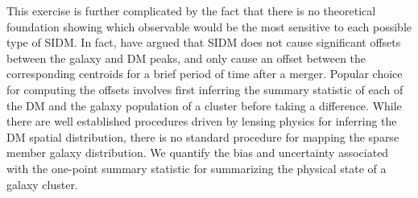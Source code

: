 This exercise is further complicated by the fact that there is no theoretical
foundation showing which observable would be the most sensitive to each
possible type of SIDM. In fact, \cite{Kahlhoefer14} have argued that SIDM 
does not cause
significant offsets between the galaxy and DM peaks, and only cause an offset
between the corresponding centroids for a brief period of time after a merger. 
Popular choice for computing the offsets involves first inferring the summary
statistic of each of the DM and the galaxy population of a cluster before
taking a difference.
While there are well established procedures driven by lensing physics for 
inferring the DM spatial distribution, there is no standard procedure for
mapping the sparse member galaxy distribution. 
We quantify the bias and uncertainty associated with the one-point summary
statistic for summarizing the physical state of a galaxy cluster. 
% 
% 
% 


